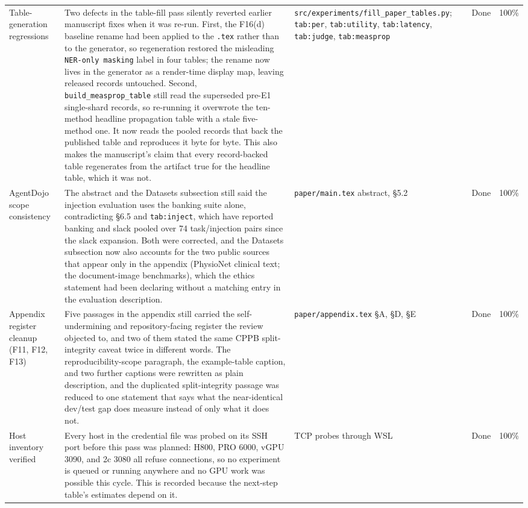 \documentclass[11pt]{article}
\begin{document}
\begin{longtable}{p{}p{}p{}p{}p{}}
Table-generation regressions & Two defects in the table-fill pass silently reverted earlier manuscript fixes when it was re-run. First, the F16(d) baseline rename had been applied to the \texttt{.tex} rather than to the generator, so regeneration restored the misleading \texttt{NER-only masking} label in four tables; the rename now lives in the generator as a render-time display map, leaving released records untouched. Second, \texttt{build\_measprop\_table} still read the superseded pre-E1 single-shard records, so re-running it overwrote the ten-method headline propagation table with a stale five-method one. It now reads the pooled records that back the published table and reproduces it byte for byte. This also makes the manuscript's claim that every record-backed table regenerates from the artifact true for the headline table, which it was not. & \texttt{src/experiments/fill\_paper\_tables.py}; \texttt{tab:per}, \texttt{tab:utility}, \texttt{tab:latency}, \texttt{tab:judge}, \texttt{tab:measprop} & Done & 100\% \\
AgentDojo scope consistency & The abstract and the Datasets subsection still said the injection evaluation uses the banking suite alone, contradicting \S6.5 and \texttt{tab:inject}, which have reported banking and slack pooled over 74 task/injection pairs since the slack expansion. Both were corrected, and the Datasets subsection now also accounts for the two public sources that appear only in the appendix (PhysioNet clinical text; the document-image benchmarks), which the ethics statement had been declaring without a matching entry in the evaluation description. & \texttt{paper/main.tex} abstract, \S5.2 & Done & 100\% \\
Appendix register cleanup (F11, F12, F13) & Five passages in the appendix still carried the self-undermining and repository-facing register the review objected to, and two of them stated the same CPPB split-integrity caveat twice in different words. The reproducibility-scope paragraph, the example-table caption, and two further captions were rewritten as plain description, and the duplicated split-integrity passage was reduced to one statement that says what the near-identical dev/test gap does measure instead of only what it does not. & \texttt{paper/appendix.tex} \S A, \S D, \S E & Done & 100\% \\
Host inventory verified & Every host in the credential file was probed on its SSH port before this pass was planned: H800, PRO 6000, vGPU 3090, and 2c 3080 all refuse connections, so no experiment is queued or running anywhere and no GPU work was possible this cycle. This is recorded because the next-step table's estimates depend on it. & TCP probes through WSL & Done & 100\% \\

\end{longtable}
\end{document}
